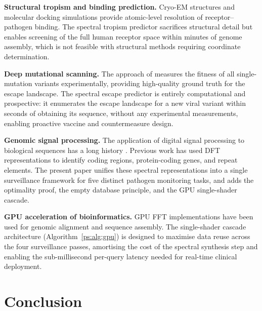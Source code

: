 \noindent\textbf{Structural tropism and binding prediction.} Cryo-EM
structures \citep{lan2020} and molecular docking simulations provide
atomic-level resolution of receptor--pathogen binding. The spectral tropism
predictor sacrifices structural detail but enables screening of the full human
receptor space within minutes of genome assembly, which is not feasible with
structural methods requiring coordinate determination.

\noindent\textbf{Deep mutational scanning.} The approach of \citet{bloom2014}
measures the fitness of all single-mutation variants experimentally, providing
high-quality ground truth for the escape landscape. The spectral escape predictor
is entirely computational and prospective: it enumerates the escape landscape
for a new viral variant within seconds of obtaining its sequence, without any
experimental measurements, enabling proactive vaccine and countermeasure design.

\noindent\textbf{Genomic signal processing.} The application of digital signal
processing to biological sequences has a long history \citep{anastassiou2001,
voss1992}. Previous work has used DFT representations to identify coding
regions, protein-coding genes, and repeat elements. The present paper unifies
these spectral representations into a single surveillance framework for five
distinct pathogen monitoring tasks, and adds the optimality proof, the empty
database principle, and the GPU single-shader cascade.

\noindent\textbf{GPU acceleration of bioinformatics.} GPU FFT implementations
\citep{moreland2003, govindaraju2008} have been used for genomic alignment and
sequence assembly. The single-shader cascade architecture (Algorithm~\ref{ps:alg:gpu})
is designed to maximise data reuse across the four surveillance passes, amortising
the cost of the spectral synthesis step and enabling the sub-millisecond
per-query latency needed for real-time clinical deployment.

\section{Conclusion}
\label{ps:sec:conclusion}

